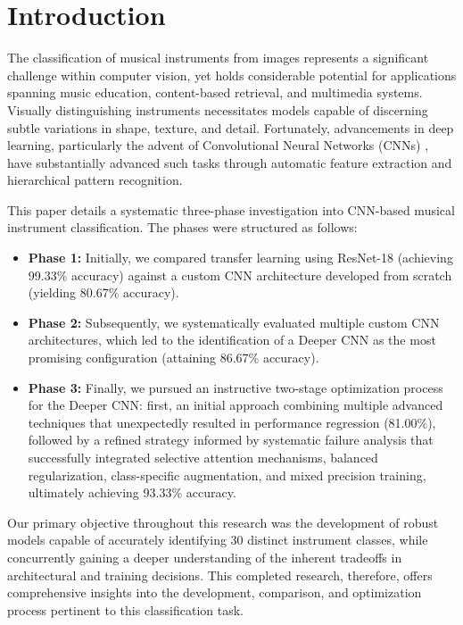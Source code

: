 
\section{Introduction}
The classification of musical instruments from images represents a significant challenge within computer vision, yet holds considerable potential for applications spanning music education, content-based retrieval, and multimedia systems. Visually distinguishing instruments necessitates models capable of discerning subtle variations in shape, texture, and detail. Fortunately, advancements in deep learning, particularly the advent of Convolutional Neural Networks (CNNs) \cite{krizhevsky2012imagenet, simonyan2014very}, have substantially advanced such tasks through automatic feature extraction and hierarchical pattern recognition.

This paper details a systematic three-phase investigation into CNN-based musical instrument classification. The phases were structured as follows:
\begin{itemize}
    \item \textbf{Phase 1:} Initially, we compared transfer learning using ResNet-18 (achieving 99.33\% accuracy) against a custom CNN architecture developed from scratch (yielding 80.67\% accuracy).
    \item \textbf{Phase 2:} Subsequently, we systematically evaluated multiple custom CNN architectures, which led to the identification of a Deeper CNN as the most promising configuration (attaining 86.67\% accuracy).
    \item \textbf{Phase 3:} Finally, we pursued an instructive two-stage optimization process for the Deeper CNN: first, an initial approach combining multiple advanced techniques that unexpectedly resulted in performance regression (81.00\%), followed by a refined strategy informed by systematic failure analysis that successfully integrated selective attention mechanisms, balanced regularization, class-specific augmentation, and mixed precision training, ultimately achieving 93.33\% accuracy.
\end{itemize}

Our primary objective throughout this research was the development of robust models capable of accurately identifying 30 distinct instrument classes, while concurrently gaining a deeper understanding of the inherent tradeoffs in architectural and training decisions. This completed research, therefore, offers comprehensive insights into the development, comparison, and optimization process pertinent to this classification task.

